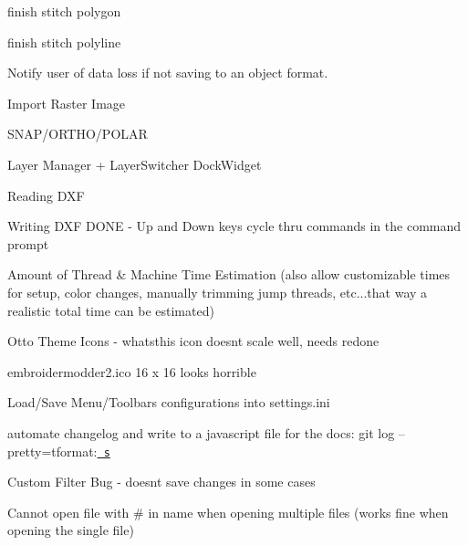 \begin{DoxyRefList}
%
finish stitch polygon  
\item[Member \mbox{\hyperlink{fill_8c_a9ae9d5d7dfbb2ab361dc37970b7eb2f2}{emb\+Pattern\+\_\+stitch\+Polyline}} (Emb\+Pattern $\ast$p, Emb\+Polyline polyline, int thread\+\_\+index, int style)]\label{todo__todo000224}%
%
finish stitch polyline  
\item[File \mbox{\hyperlink{embroidermodder_8h}{embroidermodder.h}} ]\label{todo__todo000002}%
%
Notify user of data loss if not saving to an object format. 



Import Raster Image 



SNAP/\+ORTHO/\+POLAR 



Layer Manager + Layer\+Switcher Dock\+Widget 



Reading DXF

\label{todo__todo000003}%
%
Writing DXF DONE -\/ Up and Down keys cycle thru commands in the command prompt 



Amount of Thread \& Machine Time Estimation (also allow customizable times for setup, color changes, manually trimming jump threads, etc...that way a realistic total time can be estimated) 



Otto Theme Icons -\/ whatsthis icon doesn\textquotesingle{}t scale well, needs redone 



embroidermodder2.\+ico 16 x 16 looks horrible

\label{todo__todo000004}%
%
Load/\+Save Menu/\+Toolbars configurations into settings.\+ini 



automate changelog and write to a javascript file for the docs\+: git log --pretty=tformat\+:\textquotesingle{}\href{https://github.com/Embroidermodder/Embroidermodder/commit/\%H}{\texttt{ s}}\textquotesingle{}

\label{todo__todo000005}%
%
Custom Filter Bug -\/ doesn\textquotesingle{}t save changes in some cases 



Cannot open file with \# in name when opening multiple files (works fine when opening the single file) 




\end{DoxyRefList}
